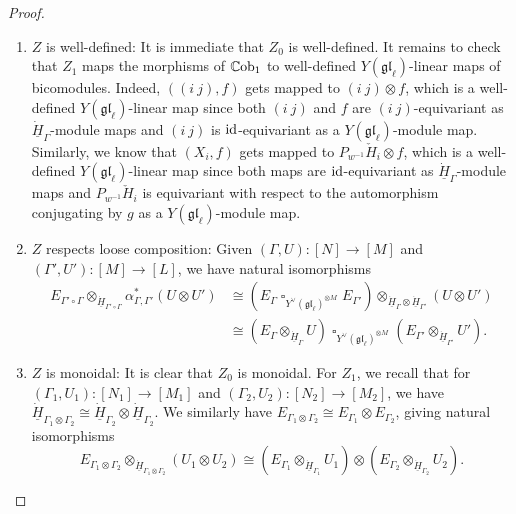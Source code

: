 \documentclass[11pt]{report}
\theoremstyle{definition}
\theoremstyle{remark}
\theoremstyle{remark}
\newcommand{\id}{\textnormal{id}}
\begin{document}
\begin{proof}
\begin{enumerate}[label=(\roman*)]
\item $Z$ is well-defined: It is immediate that $Z_0$ is well-defined. It remains to check that $Z_1$ maps the morphisms of $\mathbb{C}\textnormal{ob}_1$ to well-defined $Y(\mathfrak{gl}_\ell)$-linear maps of bicomodules. Indeed, $((i \ j),f)$ gets mapped to $(i \ j) \otimes f$, which is a well-defined $Y(\mathfrak{gl}_\ell)$-linear map since both $(i \ j)$ and $f$ are $(i \ j)$-equivariant as $\underline{\dot H}_\Gamma$-module maps and $(i \ j)$ is $\id$-equivariant as a $Y(\mathfrak{gl}_\ell)$-module map. Similarly, we know that $(X_i,f)$ gets mapped to $P_{w^{-1}} \check H_i \otimes f$, which is a well-defined $Y(\mathfrak{gl}_\ell)$-linear map since both maps are $\id$-equivariant as $\underline{\dot H}_\Gamma$-module maps and $P_{w^{-1}} \check H_i$ is equivariant with respect to the automorphism conjugating by $g$ as a $Y(\mathfrak{gl}_\ell)$-module map.
\item $Z$ respects loose composition: Given $(\Gamma,U): [N] \to [M]$ and $(\Gamma',U'): [M] \to [L]$, we have natural isomorphisms
\begin{align*}
E_{\Gamma' \circ \Gamma} \otimes_{\underline{\dot H}_{\Gamma' \circ \Gamma}} \alpha_{\Gamma,\Gamma'}^*(U \otimes U')
&\cong (E_\Gamma \operatorname{\square}_{Y^\vee(\mathfrak{gl}_\ell)^{\otimes M}} E_{\Gamma'}) \otimes_{\underline{\dot H}_\Gamma \otimes \underline{\dot H}_{\Gamma'}} (U \otimes U') \\
&\cong (E_\Gamma \otimes_{\underline{\dot H}_\Gamma} U) \operatorname{\square}_{Y^\vee(\mathfrak{gl}_\ell)^{\otimes M}} (E_{\Gamma'} \otimes_{\underline{\dot H}_{\Gamma'}} U').
\end{align*}
\item $Z$ is monoidal: It is clear that $Z_0$ is monoidal. For $Z_1$, we recall that for $(\Gamma_1,U_1): [N_1] \to [M_1]$ and $(\Gamma_2,U_2):[N_2] \to [M_2]$, we have $\underline{\dot H}_{\Gamma_1 \otimes \Gamma_2} \cong \underline{\dot H}_{\Gamma_2} \otimes \underline{\dot H}_{\Gamma_2}$. We similarly have $E_{\Gamma_1 \otimes \Gamma_2} \cong E_{\Gamma_1} \otimes E_{\Gamma_2}$, giving natural isomorphisms
\begin{equation*}
E_{\Gamma_1 \otimes \Gamma_2} \otimes_{\underline{\dot H}_{\Gamma_1 \otimes \Gamma_2}} (U_1 \otimes U_2) \cong (E_{\Gamma_1} \otimes_{\underline{\dot H}_{\Gamma_1}} U_1) \otimes (E_{\Gamma_2} \otimes_{\underline{\dot H}_{\Gamma_2}} U_2).
\end{equation*}
\end{enumerate}
\end{proof}
\end{document}
